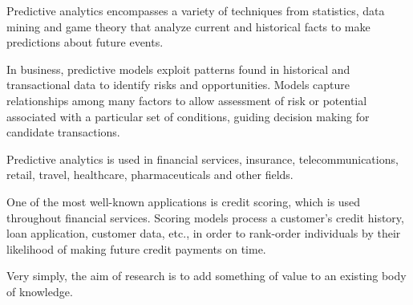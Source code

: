 \documentclass[12pt]{article}
\begin{document}
Predictive analytics encompasses a variety of techniques from statistics, data mining and game theory that analyze current and historical facts to make predictions about future events.

In business, predictive models exploit patterns found in historical and transactional data to identify risks and opportunities. Models capture relationships among many factors to allow assessment of risk or potential associated with a particular set of conditions, guiding decision making for candidate transactions.

Predictive analytics is used in financial services, insurance, telecommunications, retail, travel, healthcare, pharmaceuticals and other fields.

One of the most well-known applications is credit scoring, which is used throughout financial services. Scoring models process a customer's credit history, loan application, customer data, etc., in order to rank-order individuals by their likelihood of making future credit payments on time.



Very simply, the aim of research is to add something of value to an existing body of knowledge.
\end{document}
